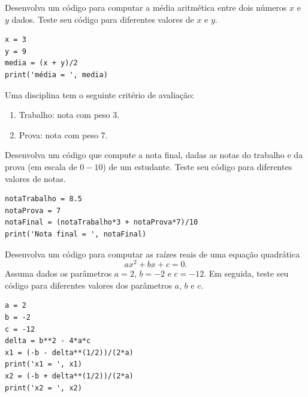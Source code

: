 \begin{exer}
  Desenvolva um código {\python} para computar a média aritmética entre dois números $x$ e $y$ dados. Teste seu código para diferentes valores de $x$ e $y$.
\end{exer}
\begin{resp}

\begin{lstlisting}
x = 3
y = 9
media = (x + y)/2
print('média = ', media)
\end{lstlisting}

\end{resp}

\begin{exer}
  Uma disciplina tem o seguinte critério de avaliação:
  \begin{enumerate}
  \item Trabalho: nota com peso 3.
  \item Prova: nota com peso 7.
  \end{enumerate}
  Desenvolva um código {\python} que compute a nota final, dadas as notas do trabalho e da prova (em escala de $0 - 10$) de um estudante. Teste seu código para diferentes valores de notas.
\end{exer}
\begin{resp}

\begin{lstlisting}
notaTrabalho = 8.5
notaProva = 7
notaFinal = (notaTrabalho*3 + notaProva*7)/10
print('Nota final = ', notaFinal)
\end{lstlisting}

\end{resp}

\begin{exer}
  Desenvolva um código {\python} para computar as raízes reais de uma equação quadrática
  \begin{equation}
    ax^2 + bx + c = 0.
  \end{equation}
  Assuma dados os parâmetros $a=2$, $b=-2$ e $c=-12$. Em seguida, teste seu código para diferentes valores dos parâmetros $a$, $b$ e $c$.
\end{exer}
\begin{resp}

\begin{lstlisting}
a = 2
b = -2
c = -12
delta = b**2 - 4*a*c
x1 = (-b - delta**(1/2))/(2*a)
print('x1 = ', x1)
x2 = (-b + delta**(1/2))/(2*a)
print('x2 = ', x2)
\end{lstlisting}

\end{resp}


